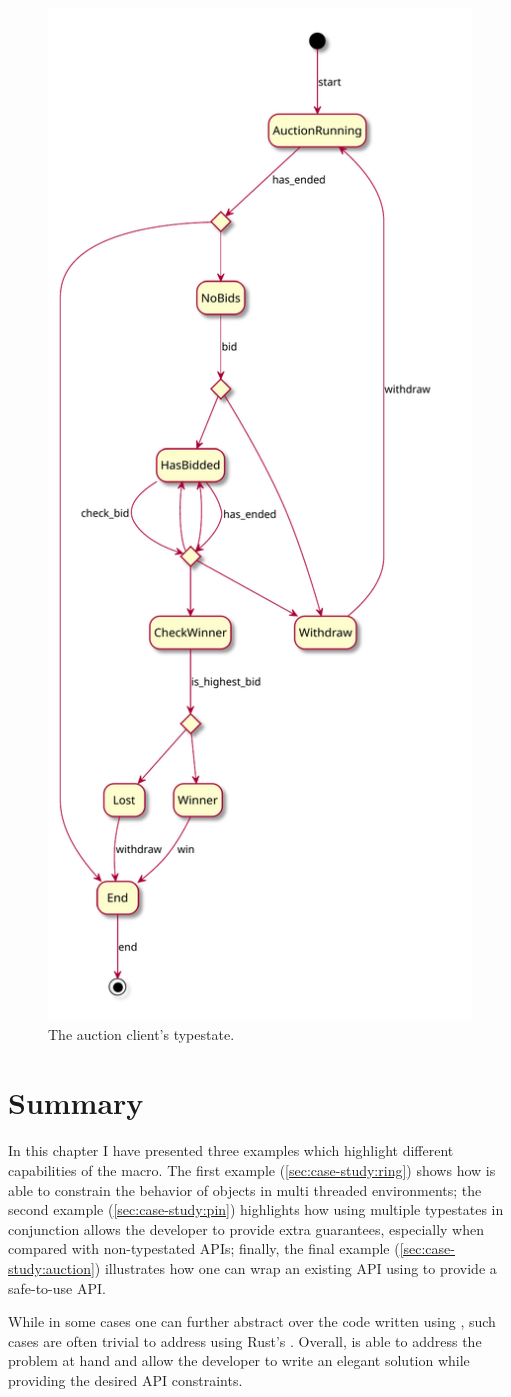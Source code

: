 \begin{figure}
    \centering
    \includegraphics[width=0.6\linewidth]{Chapters/Figures/C5/auction_client.pdf}
    \caption{The auction client's typestate.}
    \label{fig:auction-typestate}
\end{figure}

\section{Summary}

In this chapter I have presented three examples which highlight different capabilities of the  macro.
The first example (\autoref{sec:case-study:ring}) shows how  is able to constrain the behavior of objects in multi threaded environments;
the second example (\autoref{sec:case-study:pin}) highlights how using multiple typestates in conjunction allows the developer to provide extra guarantees,
especially when compared with non-typestated APIs;
finally, the final example (\autoref{sec:case-study:auction}) illustrates how one can wrap an existing API using 
to provide a safe-to-use API.

While in some cases one can further abstract over the code written using ,
such cases are often trivial to address using Rust's .
Overall,  is able to address the problem at hand and
allow the developer to write an elegant solution while providing the desired API constraints.
